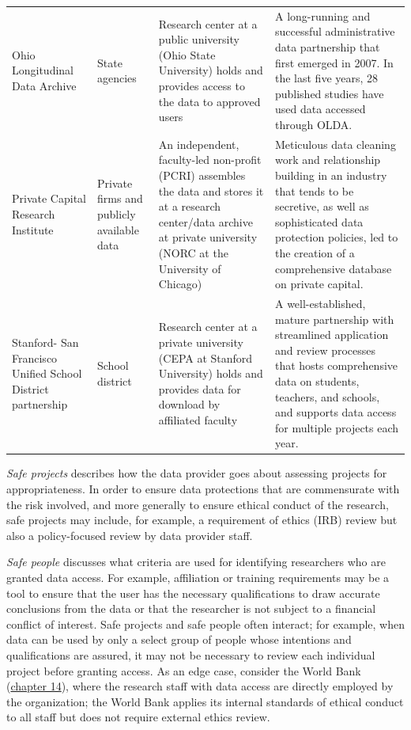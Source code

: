 \documentclass[
]{WileySix}
\begin{document}
\begin{table}
\begin{tabular}[t]{>{\raggedright\arraybackslash}p{10em}>{\raggedright\arraybackslash}p{10em}>{\raggedright\arraybackslash}p{20em}>{\raggedright\arraybackslash}p{30em}}
Ohio Longitudinal Data Archive & State agencies & Research center at a public university (Ohio State University) holds and provides access to the data to approved users & A long-running and successful administrative data partnership that first emerged in 2007. In the last five years, 28 published studies have used data accessed through OLDA.\\
Private Capital Research Institute & Private firms and publicly available data & An independent, faculty-led non-profit (PCRI) assembles the data and stores it at a research center/data archive at private university (NORC at the University of Chicago) & Meticulous data cleaning work and relationship building in an industry that tends to be secretive, as well as sophisticated data protection policies, led to the creation of a comprehensive database on private capital.\\
Stanford- San Francisco Unified School District partnership & School district & Research center at a private university (CEPA at Stanford University) holds and provides data for download by affiliated faculty & A well-established, mature partnership with streamlined application and review processes that hosts comprehensive data on students, teachers, and schools, and supports data access for multiple projects each year.\\
\bottomrule
\end{tabular}
\end{table}

\emph{Safe projects} describes how the data provider goes about assessing projects for appropriateness. In order to ensure data protections that are commensurate with the risk involved, and more generally to ensure ethical conduct of the research, safe projects may include, for example, a requirement of ethics (IRB) review but also a policy-focused review by data provider staff.

\emph{Safe people} discusses what criteria are used for identifying researchers who are granted data access. For example, affiliation or training requirements may be a tool to ensure that the user has the necessary qualifications to draw accurate conclusions from the data or that the researcher is not subject to a financial conflict of interest. Safe projects and safe people often interact; for example, when data can be used by only a select group of people whose intentions and qualifications are assured, it may not be necessary to review each individual project before granting access. As an edge case, consider the World Bank (\protect\hyperlink{dime}{chapter 14}), where the research staff with data access are directly employed by the organization; the World Bank applies its internal standards of ethical conduct to all staff but does not require external ethics review.
\end{document}

